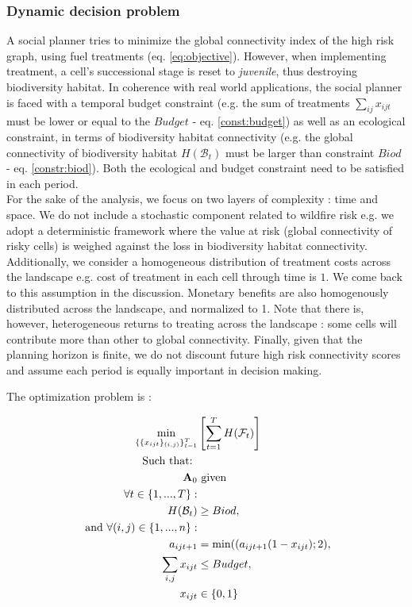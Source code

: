 \subsubsection{Dynamic decision problem}
A social planner tries to minimize the global connectivity index of the high risk graph, using fuel treatments (eq. \ref{eq:objective}). However, when implementing treatment, a cell's successional stage is reset to \textit{juvenile}, thus destroying biodiversity habitat. In coherence with real world applications, the social planner is faced with a temporal budget constraint (e.g. the sum of treatments $\sum_{ij}x_{ijt}$ must be lower or equal to the $Budget$ - eq. \ref{const:budget}) as well as an ecological constraint, in terms of biodiversity habitat connectivity (e.g. the global connectivity of biodiversity habitat $H(\mathcal{B}_t)$ must be larger than constraint $Biod$ - eq. \ref{constr:biod}). Both the ecological and budget constraint need to be satisfied in each period.
\\
For the sake of the analysis, we focus on two layers of complexity : time and space. We do not include a stochastic component related to wildfire risk e.g. we adopt a deterministic framework where the value at risk (global connectivity of risky cells) is weighed against the loss in biodiversity habitat connectivity. Additionally, we consider a homogeneous distribution of treatment costs across the landscape e.g. cost of treatment in each cell through time is $1$. We come back to this assumption in the discussion. Monetary benefits are also homogenously distributed across the landscape, and normalized to 1. Note that there is, however, heterogeneous returns to treating across the landscape : some cells will contribute more than other to global connectivity. Finally, given that the planning horizon is finite, we do not discount future high risk connectivity scores and assume each period is equally important in decision making.

The optimization problem is : 

\begin{align}
    \min_{ \{\{x_{ijt}\}_{(i,j)}\}_{t=1}^T} & \left[ \sum_{t=1}^T H(\mathcal{F}_t)\right] \label{eq:objective}\\
\text{Such that: } & \notag \\
\mathbf{A}_0 &\text{ given} \label{eq:init_cond}\\
\forall t \in \{1, ..., T\} : & \notag \\
H(\mathcal{B}_t)&\geq Biod,\text{  }\label{constr:biod}\\
\text{ and }\forall (i,j) \in \{1,...,n\}   :& \notag \\
a_{ijt+1}& = \min((a_{ijt+1}(1-x_{ijt});2), \label{const:dyn}\\
 \sum_{i,j} x_{ijt} & \leq Budget,\text{  } \label{const:budget}\\
x_{ijt}&\in \{0,1\}\label{const:control}
\end{align}

